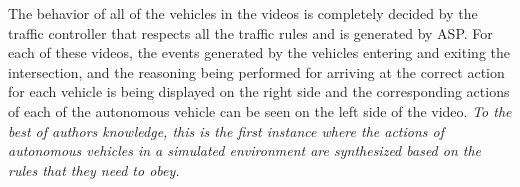 The behavior of all of the vehicles in the videos is completely decided by the traffic controller that respects all the traffic rules and is generated by ASP. For each of these videos, the events generated by the vehicles entering and exiting the intersection, and the reasoning being performed for arriving at the correct action for each vehicle is being displayed on the right side and the corresponding actions of each of the autonomous vehicle can be seen on the left side of the video. \emph{To the best of authors knowledge, this is the first instance where the actions of autonomous vehicles in a simulated environment are synthesized based on the rules that they need to obey.}




